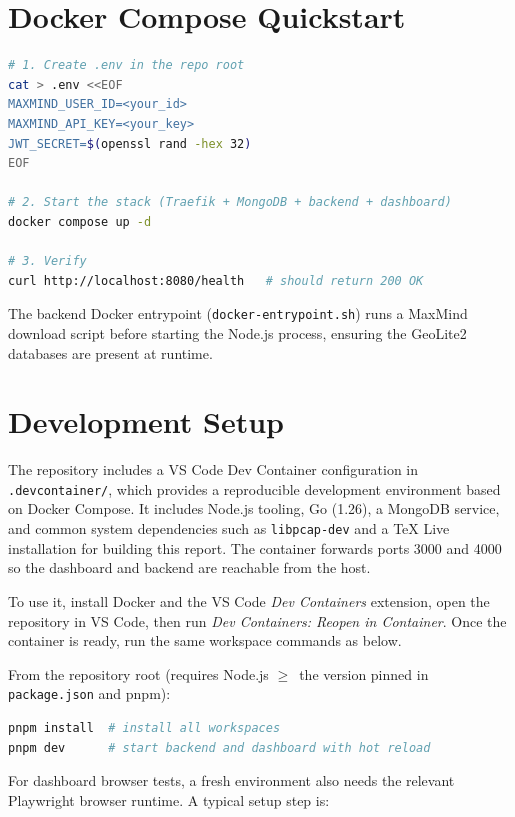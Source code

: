 \documentclass[12pt]{report}
\begin{document}
\section{Docker Compose Quickstart}

\begin{lstlisting}[language=bash, caption={Production deployment with Docker Compose.}, label=lst:deploy]
# 1. Create .env in the repo root
cat > .env <<EOF
MAXMIND_USER_ID=<your_id>
MAXMIND_API_KEY=<your_key>
JWT_SECRET=$(openssl rand -hex 32)
EOF

# 2. Start the stack (Traefik + MongoDB + backend + dashboard)
docker compose up -d

# 3. Verify
curl http://localhost:8080/health   # should return 200 OK
\end{lstlisting}

The backend Docker entrypoint (\texttt{docker-entrypoint.sh}) runs a MaxMind download
script before starting the Node.js process, ensuring the GeoLite2 databases are present at
runtime.

\section{Development Setup}

The repository includes a VS Code Dev Container configuration in \texttt{.devcontainer/},
which provides a reproducible development environment based on Docker Compose. It includes
Node.js tooling, Go (1.26), a MongoDB service, and common system dependencies such as
\texttt{libpcap-dev} and a TeX Live installation for building this report. The container
forwards ports 3000 and 4000 so the dashboard and backend are reachable from the host.

To use it, install Docker and the VS Code \emph{Dev Containers} extension, open the
repository in VS Code, then run \emph{Dev Containers: Reopen in Container}. Once the
container is ready, run the same workspace commands as below.

From the repository root (requires Node.js $\geq$~the version pinned in
\texttt{package.json} and pnpm):

\begin{lstlisting}[language=bash, caption={Local development setup.}, label=lst:devsetup]
pnpm install  # install all workspaces
pnpm dev      # start backend and dashboard with hot reload
\end{lstlisting}

For dashboard browser tests, a fresh environment also needs the relevant Playwright browser
runtime. A typical setup step is:
\end{document}
